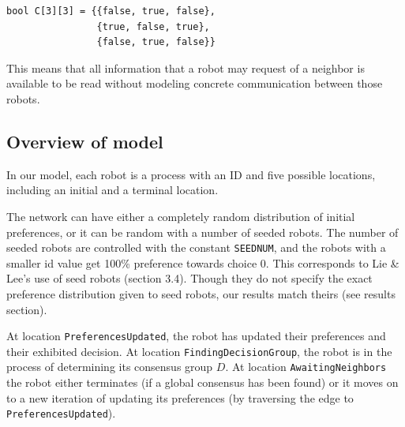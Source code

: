 \begin{verbatim}
bool C[3][3] = {{false, true, false},
                {true, false, true},
                {false, true, false}}
\end{verbatim}

This means that all information that a robot may request of a neighbor is available to be read without modeling concrete communication between those robots.

\subsection{Overview of model}

In our model, each robot is a process with an ID and five possible locations, including an initial and a terminal location.

The network can have either a completely random distribution of initial preferences, or it can be random with a number of seeded robots.
The number of seeded robots are controlled with the constant \texttt{SEEDNUM}, and the robots with a smaller id value get 100\% preference towards choice 0. This corresponds to Lie \& Lee's use of seed robots (section 3.4).
Though they do not specify the exact preference distribution given to seed robots, our results match theirs (see results section).

At location \texttt{PreferencesUpdated}, the robot has updated their preferences and their exhibited decision. At location \texttt{FindingDecisionGroup}, the robot is in the process of determining its consensus group $D$. At location \texttt{AwaitingNeighbors} the robot either terminates (if a global consensus has been found) or it moves on to a new iteration of updating its preferences (by traversing the edge to \texttt{PreferencesUpdated}).


